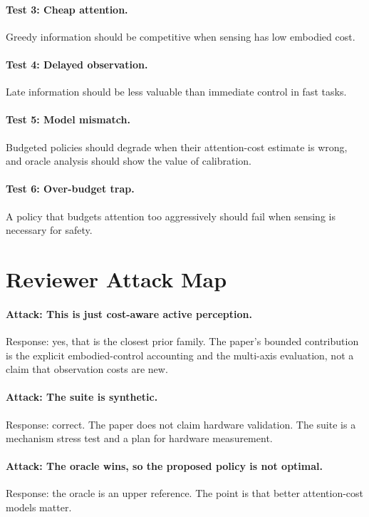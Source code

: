 \documentclass{article}
\begin{document}
\paragraph{Test 3: Cheap attention.}
Greedy information should be competitive when sensing has low embodied cost.

\paragraph{Test 4: Delayed observation.}
Late information should be less valuable than immediate control in fast tasks.

\paragraph{Test 5: Model mismatch.}
Budgeted policies should degrade when their attention-cost estimate is wrong,
and oracle analysis should show the value of calibration.

\paragraph{Test 6: Over-budget trap.}
A policy that budgets attention too aggressively should fail when sensing is
necessary for safety.

\section{Reviewer Attack Map}

\paragraph{Attack: This is just cost-aware active perception.}
Response: yes, that is the closest prior family. The paper's bounded
contribution is the explicit embodied-control accounting and the multi-axis
evaluation, not a claim that observation costs are new.

\paragraph{Attack: The suite is synthetic.}
Response: correct. The paper does not claim hardware validation. The suite is
a mechanism stress test and a plan for hardware measurement.

\paragraph{Attack: The oracle wins, so the proposed policy is not optimal.}
Response: the oracle is an upper reference. The point is that better
attention-cost models matter.
\end{document}

